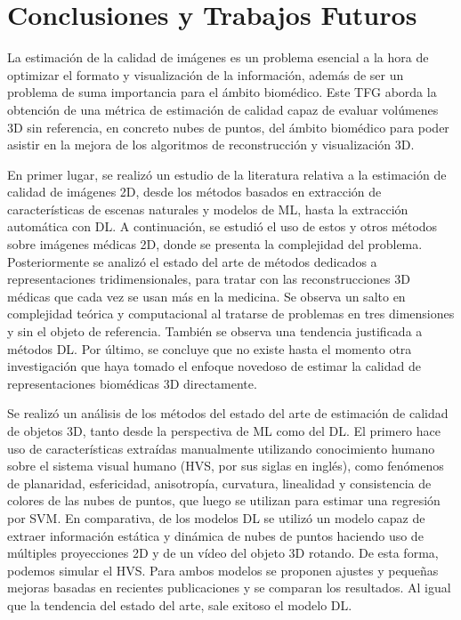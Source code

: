 \chapter{Conclusiones y Trabajos Futuros}
La estimación de la calidad de imágenes es un problema esencial a la hora 
de optimizar el formato y visualización de la información, además de ser 
un problema de suma importancia para el ámbito biomédico. Este TFG aborda 
la obtención de una métrica de estimación de calidad capaz de evaluar volúmenes 
3D sin referencia, en concreto nubes de puntos, del ámbito biomédico para poder asistir 
en la mejora de los algoritmos de reconstrucción y visualización 3D. 

En primer lugar, se realizó un estudio de la literatura relativa a la estimación de calidad 
de imágenes 2D, desde los métodos basados en extracción de características de escenas naturales y modelos de ML, hasta la extracción automática con DL. 
A continuación, se estudió el uso de estos y otros métodos sobre imágenes médicas 2D, donde se presenta la complejidad del problema. Posteriormente se analizó el estado del arte de métodos dedicados a representaciones tridimensionales, para tratar con las reconstrucciones 3D médicas que cada vez se usan más en la medicina. Se observa un salto en complejidad teórica y computacional al tratarse de problemas en tres dimensiones y sin el objeto de referencia. También se observa una tendencia justificada a métodos DL. 
 Por último, se concluye que no existe hasta el momento 
otra investigación que haya tomado el enfoque novedoso de estimar la calidad de 
representaciones biomédicas 3D directamente. 

Se realizó un análisis de los métodos del estado del arte de estimación de calidad de objetos 
3D, tanto desde la perspectiva de ML como del DL. El primero hace uso de características 
extraídas manualmente utilizando conocimiento humano sobre el sistema visual humano (HVS, por sus siglas en inglés), 
como fenómenos de planaridad, esfericidad, anisotropía, curvatura, linealidad y consistencia de 
colores de las nubes de puntos, que luego se utilizan para estimar una regresión por 
SVM. En comparativa, de los modelos DL se utilizó un modelo capaz de extraer 
información estática y dinámica de nubes de puntos haciendo uso de múltiples 
proyecciones 2D y de un vídeo del objeto 3D rotando. De esta forma, podemos  
simular el HVS. Para ambos modelos se proponen ajustes y pequeñas mejoras basadas 
en recientes publicaciones y se comparan los resultados. 
Al igual que la tendencia del estado del arte, sale exitoso el modelo DL. 

